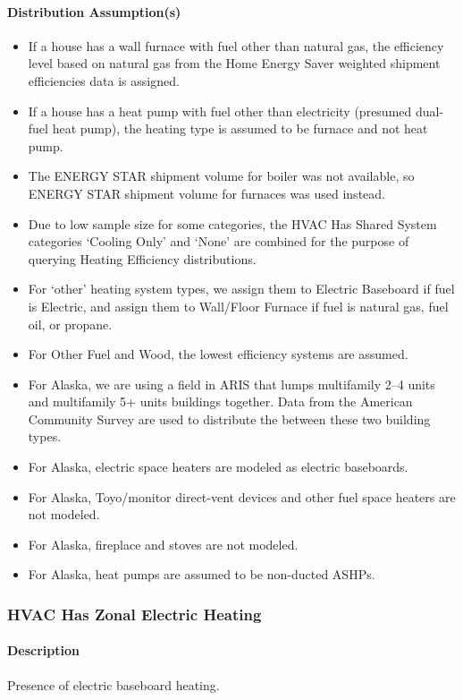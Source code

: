 \paragraph{Distribution Assumption(s)}
\begin{itemize}
    \item If a house has a wall furnace with fuel other than natural gas, the efficiency level based on natural gas from the Home Energy Saver weighted shipment efficiencies data is assigned.
    \item If a house has a heat pump with fuel other than electricity (presumed dual-fuel heat pump), the heating type is assumed to be furnace and not heat pump.
    \item The ENERGY STAR shipment volume for boiler was not available, so ENERGY STAR shipment volume for furnaces was used instead.
    \item Due to low sample size for some categories, the HVAC Has Shared System categories ‘Cooling Only’ and ‘None’ are combined for the purpose of querying Heating Efficiency distributions.
    \item For ‘other’ heating system types, we assign them to Electric Baseboard if fuel is Electric, and assign them to Wall/Floor Furnace if fuel is natural gas, fuel oil, or propane.
    \item For Other Fuel and Wood, the lowest efficiency systems are assumed.
    \item For Alaska, we are using a field in ARIS that lumps multifamily 2--4 units and multifamily 5+ units buildings together. Data from the American Community Survey are used to distribute the between these two building types.
    \item For Alaska, electric space heaters are modeled as electric baseboards.
    \item For Alaska, Toyo/monitor direct-vent devices and other fuel space heaters are not modeled.
    \item For Alaska, fireplace and stoves are not modeled.
    \item For Alaska, heat pumps are assumed to be non-ducted ASHPs.
\end{itemize}
 
\subsubsection{HVAC Has Zonal Electric Heating}
\paragraph{Description}
Presence of electric baseboard heating.

